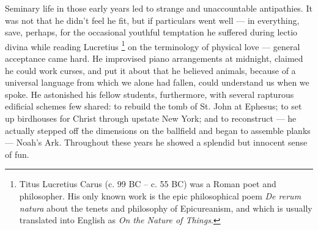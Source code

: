   Seminary life in those early years led to strange and unaccountable antipathies. 
It was not that he didn't feel he fit, but if particulars went
well --- in everything, save, perhaps, for the occasional youthful temptation he
suffered during lectio 
divina while reading Lucretius 
\footnote{Titus Lucretius Carus (c. 99 BC -- c. 55 BC) was
a Roman poet and philosopher. His only known work is the epic philosophical poem
\textit{De rerum natura} about the tenets and philosophy of Epicureanism, and which is
usually translated into English as \textit{On the Nature of Things}. 
}
on the terminology of physical love --- general acceptance came hard. He improvised 
piano arrangements at
midnight, claimed he could work curses, and put it about that he believed
animals, because of a universal language from which we alone had fallen, could
understand us when we spoke. He astonished his fellow students, furthermore,
with several rapturous 
edificial 
schemes few shared: to rebuild the tomb of St. John at Ephesus; 
to set up birdhouses for Christ through upstate New York; and
to reconstruct --- he actually stepped off the dimensions on the ballfield and began
to assemble planks 
--- Noah's Ark. Throughout these years he showed a splendid but
innocent sense of fun.

